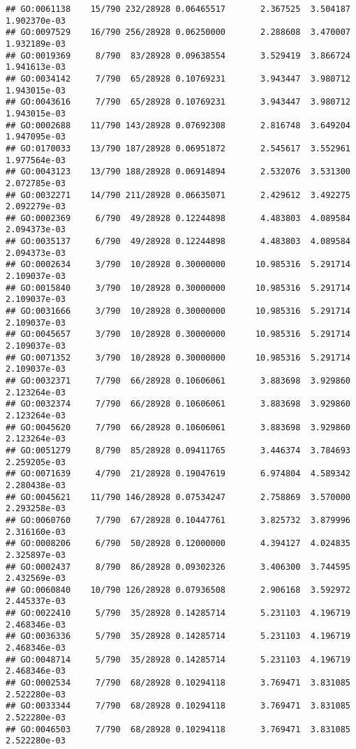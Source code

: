 \documentclass[
]{article}
\begin{document}
\begin{verbatim}
## GO:0061138    15/790 232/28928 0.06465517       2.367525  3.504187 1.902370e-03
## GO:0097529    16/790 256/28928 0.06250000       2.288608  3.470007 1.932189e-03
## GO:0019369     8/790  83/28928 0.09638554       3.529419  3.866724 1.941613e-03
## GO:0034142     7/790  65/28928 0.10769231       3.943447  3.980712 1.943015e-03
## GO:0043616     7/790  65/28928 0.10769231       3.943447  3.980712 1.943015e-03
## GO:0002688    11/790 143/28928 0.07692308       2.816748  3.649204 1.947095e-03
## GO:0170033    13/790 187/28928 0.06951872       2.545617  3.552961 1.977564e-03
## GO:0043123    13/790 188/28928 0.06914894       2.532076  3.531300 2.072785e-03
## GO:0032271    14/790 211/28928 0.06635071       2.429612  3.492275 2.092279e-03
## GO:0002369     6/790  49/28928 0.12244898       4.483803  4.089584 2.094373e-03
## GO:0035137     6/790  49/28928 0.12244898       4.483803  4.089584 2.094373e-03
## GO:0002634     3/790  10/28928 0.30000000      10.985316  5.291714 2.109037e-03
## GO:0015840     3/790  10/28928 0.30000000      10.985316  5.291714 2.109037e-03
## GO:0031666     3/790  10/28928 0.30000000      10.985316  5.291714 2.109037e-03
## GO:0045657     3/790  10/28928 0.30000000      10.985316  5.291714 2.109037e-03
## GO:0071352     3/790  10/28928 0.30000000      10.985316  5.291714 2.109037e-03
## GO:0032371     7/790  66/28928 0.10606061       3.883698  3.929860 2.123264e-03
## GO:0032374     7/790  66/28928 0.10606061       3.883698  3.929860 2.123264e-03
## GO:0045620     7/790  66/28928 0.10606061       3.883698  3.929860 2.123264e-03
## GO:0051279     8/790  85/28928 0.09411765       3.446374  3.784693 2.259205e-03
## GO:0071639     4/790  21/28928 0.19047619       6.974804  4.589342 2.280438e-03
## GO:0045621    11/790 146/28928 0.07534247       2.758869  3.570000 2.293258e-03
## GO:0060760     7/790  67/28928 0.10447761       3.825732  3.879996 2.316160e-03
## GO:0008206     6/790  50/28928 0.12000000       4.394127  4.024835 2.325897e-03
## GO:0002437     8/790  86/28928 0.09302326       3.406300  3.744595 2.432569e-03
## GO:0060840    10/790 126/28928 0.07936508       2.906168  3.592972 2.445337e-03
## GO:0022410     5/790  35/28928 0.14285714       5.231103  4.196719 2.468346e-03
## GO:0036336     5/790  35/28928 0.14285714       5.231103  4.196719 2.468346e-03
## GO:0048714     5/790  35/28928 0.14285714       5.231103  4.196719 2.468346e-03
## GO:0002534     7/790  68/28928 0.10294118       3.769471  3.831085 2.522280e-03
## GO:0033344     7/790  68/28928 0.10294118       3.769471  3.831085 2.522280e-03
## GO:0046503     7/790  68/28928 0.10294118       3.769471  3.831085 2.522280e-03

\end{verbatim}
\end{document}

